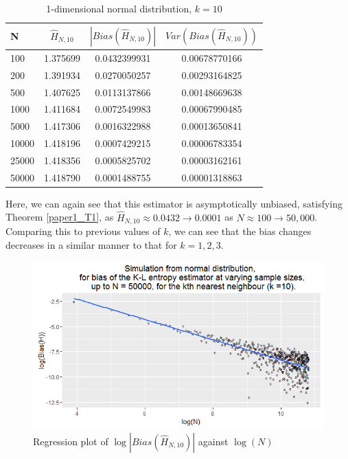 \documentclass{article}
\begin{document}
\begin{table}
\caption{1-dimensional normal distribution, $k=10$} \label{normal_k=10_table}
\begin{center}
\begin{tabular}{| l | c c c|} 
\toprule
N & $\hat{H}_{N, 10}$ & $|Bias(\hat{H}_{N, 10})|$ & $Var(Bias(\hat{H}_{N, 10}))$ \\
\midrule[1pt]
100     & 1.375699     & 0.0432399931     & 0.00678770166  \\
200     & 1.391934     & 0.0270050257     & 0.00293164825  \\
500     & 1.407625     & 0.0113137866     & 0.00148669638  \\
1000    & 1.411684     & 0.0072549983     & 0.00067990485  \\
5000    & 1.417306     & 0.0016322988     & 0.00013650841  \\
10000   & 1.418196     & 0.0007429215     & 0.00006783354  \\
25000   & 1.418356     & 0.0005825702     & 0.00003162161  \\
50000   & 1.418790     & 0.0001488755     & 0.00001318863  \\
\hline
\end{tabular}
\end{center}
\end{table}

Here, we can again see that this estimator is asymptotically unbiased, satisfying Theorem \ref{paper1_T1}, as $\hat{H}_{N, 10} \approx  0.0432 \to 0.0001$ as $N \approx 100 \to 50,000$. Comparing this to previous values of $k$, we can see that the bias changes decreases in a similar manner to that for $k=1, 2, 3$.

\begin{figure}
  \begin{center}
    \includegraphics[width=\textwidth]{./Graphs/Normal_k=10_plot.png}
  \end{center}
\caption{Regression plot of $\log|Bias(\hat{H}_{N, 10})|$ against $\log(N)$}
  \label{normal_k=10_graph}
\end{figure}
\end{document}
